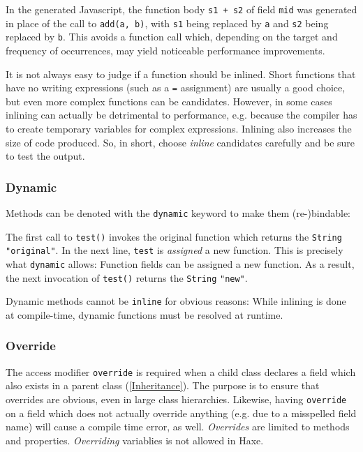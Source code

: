 \documentclass{article}
\newcommand{\type}[1]{\texttt{#1}}
\newcommand{\expr}[1]{\texttt{#1}}
\newcommand{\tref}[2]{#1 (\ref{#2})}
\newcommand{\haxe}[2][]{%
}
\begin{document}
In the generated Javascript, the function body \expr{s1 + s2} of field \expr{mid} was generated in place of the call to \expr{add(a, b)}, with \expr{s1} being replaced by \expr{a} and \expr{s2} being replaced by \expr{b}. This avoids a function call which, depending on the target and frequency of occurrences, may yield noticeable performance improvements.

It is not always easy to judge if a function should be inlined. Short functions that have no writing expressions (such as a \expr{=} assignment) are usually a good choice, but even more complex functions can be candidates. However, in some cases inlining can actually be detrimental to performance, e.g. because the compiler has to create temporary variables for complex expressions. Inlining also increases the size of code produced. So, in short, choose \emph{inline} candidates carefully and be sure to test the output.
\subsubsection{Dynamic}
\label{Dynamic}

Methods can be denoted with the \expr{dynamic} keyword to make them (re-)bindable:

\haxe{assets/DynamicFunction.hx}

The first call to \expr{test()} invokes the original function which returns the \type{String} \expr{"original"}. In the next line, \expr{test} is \emph{assigned} a new function. This is precisely what \expr{dynamic} allows: Function fields can be assigned a new function. As a result, the next invocation of \expr{test()} returns the \type{String} \expr{"new"}.

Dynamic methods cannot be \expr{inline} for obvious reasons: While inlining is done at compile-time, dynamic functions must be resolved at runtime.


\subsubsection{Override}
\label{Override}

The access modifier \expr{override} is required when a child class declares a field which also exists in a \tref{parent class}{Inheritance}. The purpose is to ensure that overrides are obvious, even in large class hierarchies. Likewise, having \expr{override} on a field which does not actually override anything (e.g. due to a misspelled field name) will cause a compile time error, as well.
\emph{Overrides} are limited to methods and properties.  \emph{Overriding} variablies is not allowed in Haxe.
\end{document}
